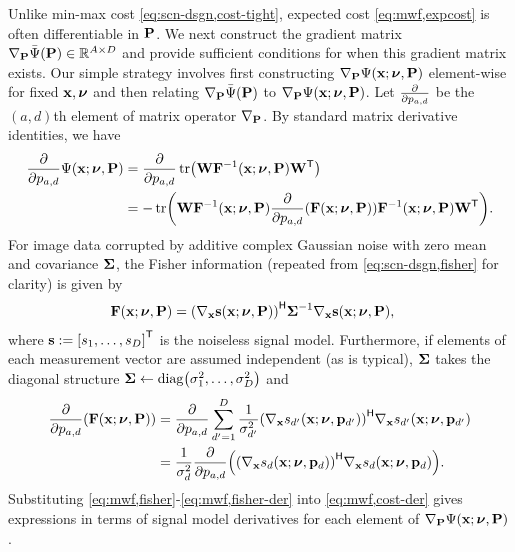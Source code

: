 Unlike min-max cost \eqref{eq:scn-dsgn,cost-tight},
expected cost \eqref{eq:mwf,expcost} is often differentiable in $\mathbf{P}$.
We next construct the gradient matrix 
$\grada{\bmP}{\expcost\paren{\bmP}} \in \reals{A \times D}$
and provide sufficient conditions
for when this gradient matrix exists.
Our simple strategy involves 
first constructing $\grada{\bmP}{\costa{\bmx; \bmnu, \bmP}}$
element-wise 
for fixed $\mathbf{x},\boldsymbol{\nu}$
and then relating
$\grada{\bmP}{\expcost\paren{\bmP}}$
to $\grada{\bmP}{\costa{\bmx; \bmnu, \bmP}}$.
Let $\frac{\partial}{\partial p_{a,d}}$ be the $(a,d)$th element
of matrix operator $\nabla_{\mathbf{P}}$.
By standard matrix derivative identities,
we have
\begin{align}
	\dela{p_{a,d}} \costa{\bmx; \bmnu, \bmP}
		&= 
		\dela{p_{a,d}} \trace{\bmW \bmF^{-1}\paren{\bmx;\bmnu,\bmP} \bmW\tpose}
		\nonumber \\
		&= -\trace{\bmW \bmF^{-1}\paren{\bmx;\bmnu,\bmP} 
		\dela{p_{a,d}}\paren{\Fisher{\bmx;\bmnu,\bmP}} 
		\bmF^{-1}\paren{\bmx;\bmnu,\bmP} \bmW\tpose}.
		\label{eq:mwf,cost-der}
\end{align}
For image data corrupted
by additive complex Gaussian noise 
with zero mean 
and covariance $\boldsymbol{\Sigma}$,
the Fisher information
(repeated from \eqref{eq:scn-dsgn,fisher} for clarity)
is given by
\begin{align}
	\Fisher{\bmx; \bmnu, \bmP}
		&=
		\paren{\grada{\bmx} \bms\paren{\bmx; \bmnu, \bmP}}\ctpose
    \bmSig^{-1} \grada{\bmx} \bms\paren{\bmx; \bmnu, \bmP},
   \label{eq:mwf,fisher}
\end{align}
where $\bms := \brac{s_1,\dots,s_D}\tpose$ 
is the noiseless signal model.
Furthermore, 
if elements of each measurement vector
are assumed independent
(as is typical),
$\boldsymbol{\Sigma}$ takes the diagonal structure
$\bmSig \gets \diag{\sigma_1^2,\dots,\sigma_D^2}$
and
\begin{align}
	\dela{p_{a,d}}\paren{\Fisher{\bmx;\bmnu,\bmP}} 
		&= 
		\dela{p_{a,d}} \sum_{d'=1}^D \frac{1}{\sigma_{d'}^2}
		\paren{\grada{\bmx}{s_{d'}\paren{\bmx; \bmnu, \bmp_{d'}}}}\ctpose
		\grada{\bmx}{s_{d'}\paren{\bmx; \bmnu, \bmp_{d'}}}
		\nonumber \\
		&= 
		\frac{1}{\sigma_d^2} \dela{p_{a,d}} 
		\paren{\paren{\grada{\bmx}{s_d\paren{\bmx; \bmnu, \bmp_d}}}\ctpose
		\grada{\bmx}{s_d\paren{\bmx; \bmnu, \bmp_d}}}.
		\label{eq:mwf,fisher-der}
\end{align}
Substituting \eqref{eq:mwf,fisher}-\eqref{eq:mwf,fisher-der}
into \eqref{eq:mwf,cost-der} 
gives expressions 
in terms of signal model derivatives
for each element 
of $\grada{\bmP}{\costa{\bmx; \bmnu, \bmP}}$.
